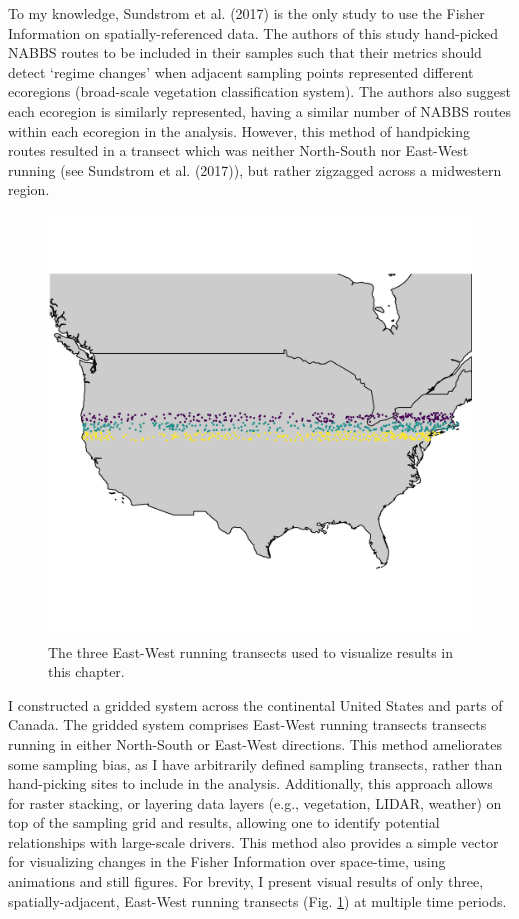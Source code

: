 \documentclass[12pt,twoside,openany]{reedthesis}
\begin{document}
To my knowledge, Sundstrom et al. (2017) is the only study to use the Fisher Information on spatially-referenced data. The authors of this study hand-picked NABBS routes to be included in their samples such that their metrics should detect `regime changes' when adjacent sampling points represented different ecoregions (broad-scale vegetation classification system). The authors also suggest each ecoregion is similarly represented, having a similar number of NABBS routes within each ecoregion in the analysis. However, this method of handpicking routes resulted in a transect which was neither North-South nor East-West running (see Sundstrom et al. (2017)), but rather zigzagged across a midwestern region.
\begin{figure}
\includegraphics[width=0.85\linewidth]{./chapterFiles/fisherSpatial/figures/figsCalledInDiss/transectSamplingALlRoutesUsed} \caption{The three East-West running transects used to visualize results in this chapter.}\label{fig:ewRoutesUsedHere}
\end{figure}
I constructed a gridded system across the continental United States and parts of Canada. The gridded system comprises East-West running transects transects running in either North-South or East-West directions. This method ameliorates some sampling bias, as I have arbitrarily defined sampling transects, rather than hand-picking sites to include in the analysis. Additionally, this approach allows for raster stacking, or layering data layers (e.g., vegetation, LIDAR, weather) on top of the sampling grid and results, allowing one to identify potential relationships with large-scale drivers. This method also provides a simple vector for visualizing changes in the Fisher Information over space-time, using animations and still figures. For brevity, I present visual results of only three, spatially-adjacent, East-West running transects (Fig. \ref{fig:ewRoutesUsedHere}) at multiple time periods.
\end{document}
